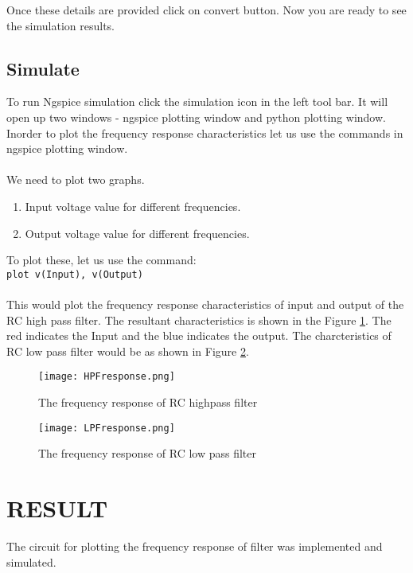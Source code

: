 \noindent Once these details are provided click on convert button.  Now you are ready to see the simulation results.


\paragraph{}
\subsection*{Simulate} To run Ngspice simulation click the simulation icon in the left tool bar. It will open up two windows - ngspice plotting window and python plotting window. Inorder to plot the frequency response characteristics let us use the commands in ngspice plotting window. 

\paragraph{}We need to plot two graphs.

\begin{enumerate}
\item
Input voltage value for different frequencies. 

\item
Output voltage value for different frequencies. 
\end{enumerate}

To plot these, let us use the command:\\

\texttt{plot v(Input), v(Output) }

\paragraph{}

This would plot the frequency response characteristics of input and output of the RC high pass filter. The resultant characteristics is shown in the Figure \ref{HPFresponse}. The red indicates the Input and the blue indicates the output. The charcteristics of RC low pass filter would be as shown in Figure \ref{LPFresponse}.


\begin{figure}[h]
\centering
\texttt{[image: HPFresponse.png]}
\caption{The frequency response of RC highpass filter}
\label{HPFresponse}
\end{figure}


\begin{figure}[h]
\centering
\texttt{[image: LPFresponse.png]}
\caption{The frequency response of RC low pass filter}
\label{LPFresponse}
\end{figure}


\section*{RESULT}
The circuit for plotting the frequency response of filter was implemented and simulated.


